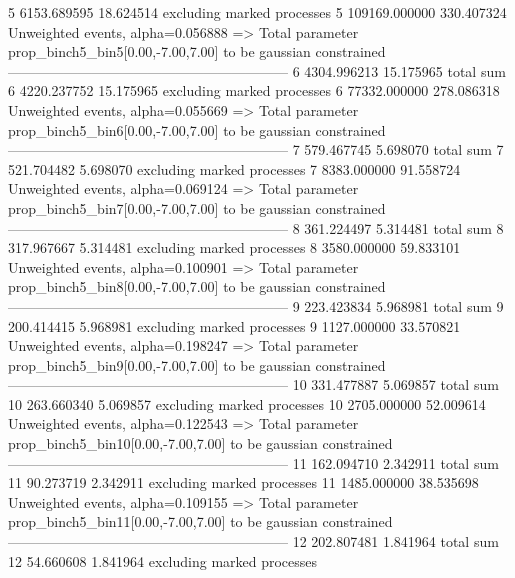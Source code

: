 5          6153.689595     18.624514       excluding marked processes    
5          109169.000000   330.407324      Unweighted events, alpha=0.056888
  => Total parameter prop_binch5_bin5[0.00,-7.00,7.00] to be gaussian constrained
------------------------------------------------------------
6          4304.996213     15.175965       total sum                     
6          4220.237752     15.175965       excluding marked processes    
6          77332.000000    278.086318      Unweighted events, alpha=0.055669
  => Total parameter prop_binch5_bin6[0.00,-7.00,7.00] to be gaussian constrained
------------------------------------------------------------
7          579.467745      5.698070        total sum                     
7          521.704482      5.698070        excluding marked processes    
7          8383.000000     91.558724       Unweighted events, alpha=0.069124
  => Total parameter prop_binch5_bin7[0.00,-7.00,7.00] to be gaussian constrained
------------------------------------------------------------
8          361.224497      5.314481        total sum                     
8          317.967667      5.314481        excluding marked processes    
8          3580.000000     59.833101       Unweighted events, alpha=0.100901
  => Total parameter prop_binch5_bin8[0.00,-7.00,7.00] to be gaussian constrained
------------------------------------------------------------
9          223.423834      5.968981        total sum                     
9          200.414415      5.968981        excluding marked processes    
9          1127.000000     33.570821       Unweighted events, alpha=0.198247
  => Total parameter prop_binch5_bin9[0.00,-7.00,7.00] to be gaussian constrained
------------------------------------------------------------
10         331.477887      5.069857        total sum                     
10         263.660340      5.069857        excluding marked processes    
10         2705.000000     52.009614       Unweighted events, alpha=0.122543
  => Total parameter prop_binch5_bin10[0.00,-7.00,7.00] to be gaussian constrained
------------------------------------------------------------
11         162.094710      2.342911        total sum                     
11         90.273719       2.342911        excluding marked processes    
11         1485.000000     38.535698       Unweighted events, alpha=0.109155
  => Total parameter prop_binch5_bin11[0.00,-7.00,7.00] to be gaussian constrained
------------------------------------------------------------
12         202.807481      1.841964        total sum                     
12         54.660608       1.841964        excluding marked processes    
